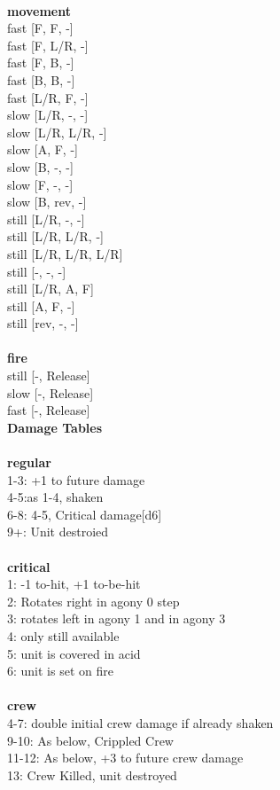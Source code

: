 {\noindent 

\ \\ {\bf movement } \\
fast [F, F, -] \\
fast [F, L/R, -] \\
fast [F, B, -] \\
fast [B, B, -] \\
fast [L/R, F, -] \\
slow [L/R, -, -] \\
slow [L/R, L/R, -] \\
slow [A, F, -] \\
slow [B, -, -] \\
slow [F, -, -] \\
slow [B, rev, -] \\
still [L/R, -, -] \\
still [L/R, L/R, -] \\
still [L/R, L/R, L/R] \\
still [-, -, -] \\
still [L/R, A, F] \\
still [A, F, -] \\
still [rev, -, -] \\
\ \\ {\bf fire } \\
still [-, Release] \\
slow [-, Release] \\
fast [-, Release] \\


{\bf Damage Tables} \\
\ \\ {\bf regular } \\
1-3: +1 to future damage \\
4-5:as 1-4, shaken \\
6-8: 4-5, Critical damage[d6] \\
9+: Unit destroied \\
\ \\ {\bf critical } \\
1: -1 to-hit, +1 to-be-hit \\
2: Rotates right in agony 0 step \\
3: rotates left in agony 1 and in agony 3 \\
4: only still available \\
5: unit is covered in acid \\
6: unit is set on fire \\
\ \\ {\bf crew } \\
4-7: double initial crew damage if already shaken \\
9-10: As below, Crippled Crew \\
11-12: As below, +3 to future crew damage \\
13: Crew Killed, unit destroyed \\


}
